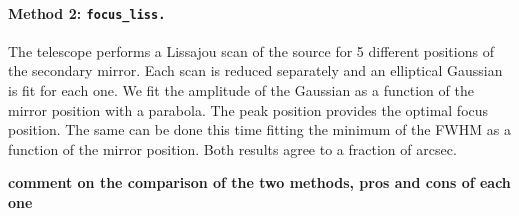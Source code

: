 \paragraph{Method 2: {\tt focus\_liss.}} The telescope performs a Lissajou scan of
the source for 5 different positions of the secondary mirror. Each scan is
reduced separately and an elliptical Gaussian is fit for each one. We fit the amplitude
of the Gaussian as a function of the mirror position with a parabola. The peak
position provides the optimal focus position. The same can be done this time
fitting the minimum of the FWHM as a function of the mirror position. Both
results agree to a fraction of arcsec.

{\bf comment on the comparison of the two methods, pros and cons of each one}
